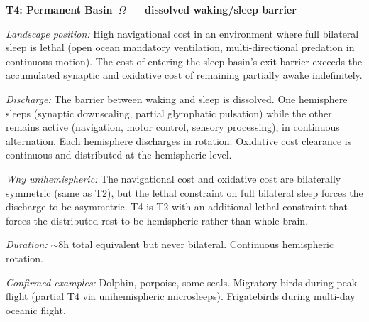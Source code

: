 \documentclass[10pt, a4paper]{article}
\begin{document}
\begin{mdframed}[
  backgroundcolor=topologybox,
  linecolor=headergreen,
  linewidth=0.8pt,
  innertopmargin=0.6em,
  innerbottommargin=0.6em,
  innerleftmargin=0.8em,
  innerrightmargin=0.8em
]
\textbf{T4: Permanent Basin~$\Omega$ ---
dissolved waking/sleep barrier}

\textit{Landscape position:} High
navigational cost in an environment where
full bilateral sleep is lethal (open ocean
mandatory ventilation, multi-directional
predation in continuous motion). The cost
of entering the sleep basin's exit barrier
exceeds the accumulated synaptic and
oxidative cost of remaining partially
awake indefinitely.

\textit{Discharge:} The barrier between
waking and sleep is dissolved. One
hemisphere sleeps (synaptic downscaling,
partial glymphatic pulsation) while the
other remains active (navigation, motor
control, sensory processing), in continuous
alternation. Each hemisphere discharges
in rotation. Oxidative cost clearance
is continuous and distributed at the
hemispheric level.

\textit{Why unihemispheric:} The
navigational cost and oxidative cost are
bilaterally symmetric (same as T2), but
the lethal constraint on full bilateral
sleep forces the discharge to be
asymmetric. T4 is T2 with an additional
lethal constraint that forces the
distributed rest to be hemispheric rather
than whole-brain.

\textit{Duration:} $\sim$8h total
equivalent but never bilateral. Continuous
hemispheric rotation.

\textit{Confirmed examples:} Dolphin,
porpoise, some seals. Migratory birds
during peak flight (partial T4 via
unihemispheric microsleeps). Frigatebirds
during multi-day oceanic flight.
\end{mdframed}

\vspace{0.4em}
\end{document}
